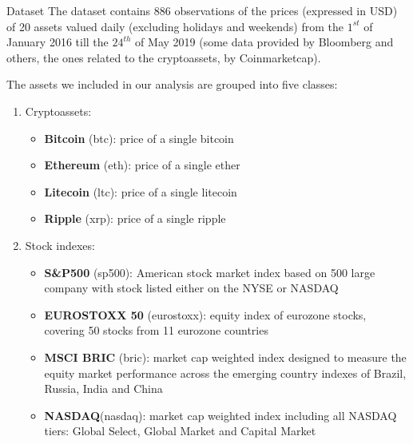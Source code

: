 \documentclass[c, 10pt]{beamer}
\newcommand\Fontvi{\fontsize{8}{7.2}\selectfont}
\begin{document}
\begin{frame}[allowframebreaks]{Dataset}
\bigskip
\Fontvi
The dataset contains 886 observations of the prices (expressed in USD) of 20 assets valued daily (excluding holidays and weekends) from the $1^{st}$ of January 2016 till the $24^{th}$ of May 2019 (some data provided by Bloomberg and others, the ones related to the cryptoassets, by Coinmarketcap).


The assets we included in our analysis are grouped into five classes:

\begin{enumerate}
	\item Cryptoassets:
	\begin{itemize}
		\Fontvi
		\item \textbf{Bitcoin} (btc): price of a single bitcoin
		\item \textbf{Ethereum} (eth): price of a single ether
		\item \textbf{Litecoin} (ltc): price of a single litecoin
		\item \textbf{Ripple} (xrp): price of a single ripple
	\end{itemize}

	\item Stock indexes:
	\begin{itemize}
		\Fontvi
		\item \textbf{S\&P500} (sp500): American stock market index based on 500 large company with stock listed either on the NYSE or NASDAQ
		\item \textbf{EUROSTOXX 50} (eurostoxx): equity index of eurozone stocks, covering 50 stocks from 11 eurozone countries
		\item \textbf{MSCI BRIC} (bric): market cap weighted index designed to measure the equity market performance across the emerging country indexes of Brazil, Russia, India and China
		\item \textbf{NASDAQ}(nasdaq): market cap weighted index including all NASDAQ tiers: Global Select, Global Market and Capital Market
	\end{itemize}
	
	\framebreak
	

\end{enumerate}
\end{frame}
\end{document}
